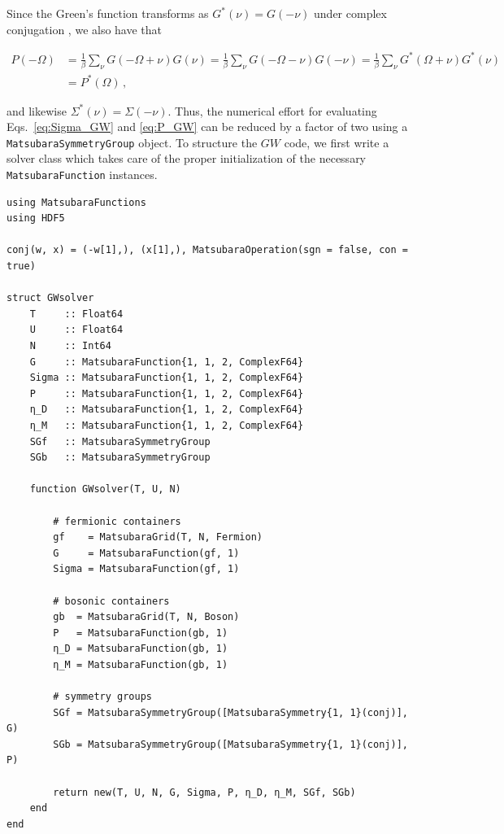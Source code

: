 \documentclass{SciPost}
\begin{document}
%
Since the Green's function transforms as $G^{*}(\nu) = G(-\nu)$ under complex conjugation \cite{rohringer2013}, we also have that
%
\begin{linenomath}
    \begin{align}
        P(-\Omega) &= \tfrac{1}{\beta} \sum_{\nu} G(-\Omega + \nu) G(\nu) = \tfrac{1}{\beta} \sum_{\nu} G(-\Omega - \nu) G(-\nu) = \tfrac{1}{\beta} \sum_{\nu} G^{*}(\Omega + \nu) G^{*}(\nu) \nonumber \\
        &= P^{*}(\Omega) \,,
    \end{align}
\end{linenomath}
%
and likewise $\Sigma^{*}(\nu) = \Sigma(-\nu)$. Thus, the numerical effort for evaluating Eqs.~\eqref{eq:Sigma_GW} and \eqref{eq:P_GW} can be reduced by a factor of two using a \texttt{MatsubaraSymmetryGroup} object. To structure the $GW$ code, we first write a solver class which takes care of the proper initialization of the necessary \texttt{MatsubaraFunction} instances. 
%
\begin{verbatim}
using MatsubaraFunctions
using HDF5

conj(w, x) = (-w[1],), (x[1],), MatsubaraOperation(sgn = false, con = true)

struct GWsolver
    T     :: Float64
    U     :: Float64
    N     :: Int64  
    G     :: MatsubaraFunction{1, 1, 2, ComplexF64}
    Sigma :: MatsubaraFunction{1, 1, 2, ComplexF64}
    P     :: MatsubaraFunction{1, 1, 2, ComplexF64}
    η_D   :: MatsubaraFunction{1, 1, 2, ComplexF64}
    η_M   :: MatsubaraFunction{1, 1, 2, ComplexF64}
    SGf   :: MatsubaraSymmetryGroup
    SGb   :: MatsubaraSymmetryGroup

    function GWsolver(T, U, N)
    
        # fermionic containers
        gf    = MatsubaraGrid(T, N, Fermion)
        G     = MatsubaraFunction(gf, 1)
        Sigma = MatsubaraFunction(gf, 1)

        # bosonic containers
        gb  = MatsubaraGrid(T, N, Boson)
        P   = MatsubaraFunction(gb, 1)
        η_D = MatsubaraFunction(gb, 1)
        η_M = MatsubaraFunction(gb, 1)     

        # symmetry groups
        SGf = MatsubaraSymmetryGroup([MatsubaraSymmetry{1, 1}(conj)], G)
        SGb = MatsubaraSymmetryGroup([MatsubaraSymmetry{1, 1}(conj)], P)

        return new(T, U, N, G, Sigma, P, η_D, η_M, SGf, SGb)
    end 
end
\end{verbatim}
\end{document}
